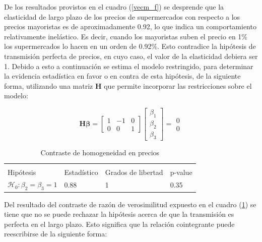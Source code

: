 \documentclass[12pt, twoside]{book}\usepackage[]{graphicx}\usepackage[]{color}
\numberwithin{equation}{section}
\numberwithin{theorem}{section}
\numberwithin{teorema}{section}
\numberwithin{defi}{section}
\numberwithin{prop}{section}
\numberwithin{defi}{section}
\theoremstyle{plain}
\begin{document}
De los resultados provistos en el cuadro (\ref{vecm_f}) se desprende que la elasticidad de largo plazo de los precios de supermercados con respecto a los precios mayoristas es de aproximadamente 0.92, lo que indica un comportamiento relativamente inelástico. Es decir, cuando los mayoristas suben el precio en 1\% los supermercados lo hacen en un orden de 0.92\%. Esto contradice la hipótesis de transmisión perfecta de precios, en cuyo caso, el valor de la elasticidad debiera ser 1. Debido a esto a continuación se estima el modelo restringido, para determinar la evidencia estadística en favor o en contra de esta hipótesis, de la siguiente forma, utilizando una matriz $\mathbf{H}$ que permite incorporar las restricciones sobre el modelo: 

\begin{equation}
\mathbf{H}\boldsymbol{\beta} = \left[\begin{array}{ccc} 1 & -1 & 0 \\ 
                                                            0 &  0 &  1 \end{array}\right]
                                   \left[\begin{array}{c} 
                                    \beta_{1} \\ \beta_{2} \\ \beta_{3} \end{array}\right]=\begin{array}{c} 0 \\ 0 \end{array}
\end{equation}



\begin{table}[!htpb]
\centering
\begin{threeparttable}
\caption{Contraste de homogeneidad en precios \label{blrtest}}
\begin{tabular}{@{}llll@{}}
\toprule \\
Hipótesis & Estadístico & Grados de libertad & p-value \\
\midrule 
$\mathcal{H}_{0}:\beta_{2}=\beta_{3}=1$ & 0.88 & 1 & 0.35
\\
\bottomrule
\end{tabular}
\end{threeparttable}
\end{table}

Del resultado del contraste de razón de verosimilitud expuesto en el cuadro (\ref{blrtest}) se tiene que no se puede rechazar la hipótesis acerca de que la transmisión es perfecta en el largo plazo. Esto significa que la relación cointegrante puede reescribirse de la siguiente forma: 
\end{document}
